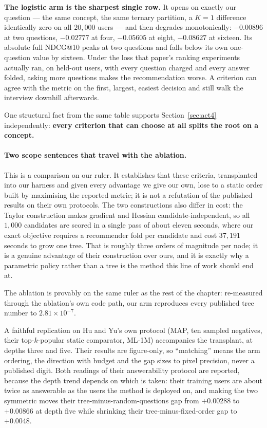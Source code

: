 \documentclass[11pt]{article}
\begin{document}
\textbf{The logistic arm is the sharpest single row.} It opens on exactly our question --- the same
concept, the same ternary partition, a $K{=}1$ difference identically zero on all $20{,}000$ users ---
and then degrades monotonically: $-0.00896$ at two questions, $-0.02777$ at four, $-0.05605$ at
eight, $-0.08627$ at sixteen. Its absolute full NDCG@10 peaks at two questions and falls below its own
one-question value by sixteen. Under the loss that paper's ranking experiments actually ran, on
held-out users, with every question charged and every answer folded, asking more questions makes the
recommendation worse. A criterion can agree with the metric on the first, largest, easiest decision
and still walk the interview downhill afterwards.

One structural fact from the same table supports Section~\ref{sec:act4} independently: \textbf{every
criterion that can choose at all splits the root on a concept.}

\paragraph{Two scope sentences that travel with the ablation.} This is a comparison on our ruler. It
establishes that these criteria, transplanted into our harness and given every advantage we give our
own, lose to a static order built by maximising the reported metric; it is not a refutation of the
published results on their own protocols. The two constructions also differ in cost: the
Taylor construction makes gradient and Hessian candidate-independent, so all $1{,}000$ candidates are
scored in a single pass of about eleven seconds, where our exact objective requires a recommender fold
per candidate and cost $37{,}191$ seconds to grow one tree. That is roughly three orders of magnitude
per node; it is a genuine advantage of their construction over ours, and it is exactly why a
parametric policy rather than a tree is the method this line of work should end at.

The ablation is provably on the same ruler as the rest of the chapter: re-measured through the
ablation's own code path, our arm reproduces every published tree number to $2.81\times10^{-7}$.

A faithful replication on Hu and Yu's own protocol (MAP, ten sampled negatives, their top-$k$-popular static
comparator, ML-1M) accompanies the transplant, at depths three and five. Their results are
figure-only, so ``matching'' means the arm ordering, the direction with budget and the gap sizes to
pixel precision, never a published digit. Both readings of their answerability protocol are reported,
because the depth trend depends on which is taken: their training users are about twice as answerable
as the users the method is deployed on, and making the two symmetric moves their
tree-minus-random-questions gap from $+0.00288$ to $+0.00866$ at depth five while shrinking their
tree-minus-fixed-order gap to $+0.0048$.
\end{document}

